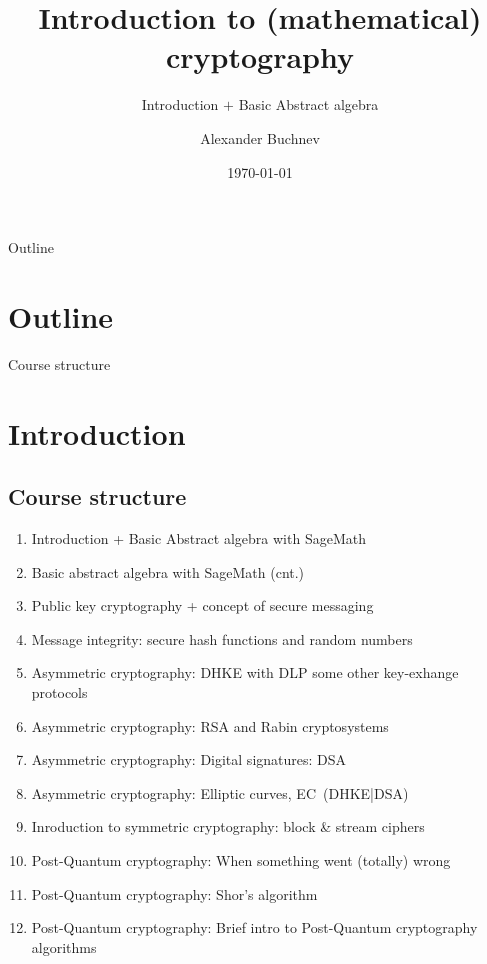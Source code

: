 \documentclass{beamer}
\title{Introduction to (mathematical) cryptography}
\subtitle{Introduction $+$ Basic Abstract algebra}
\author{Alexander Buchnev}
\date{\monthYear\today}
\begin{document}
\frame{
	\titlepage
}

\begin{frame}{Outline}
    \section{Outline}
	\tableofcontents
\end{frame}

\begin{frame}{Course structure}
    \section{Introduction}
    \subsection{Course structure}
    \begin{enumerate}
        \item Introduction + Basic Abstract algebra with SageMath
        \item Basic abstract algebra with SageMath (cnt.)
        \item Public key cryptography + concept of secure messaging %
        \item Message integrity: secure hash functions and random numbers
        \item Asymmetric cryptography: DHKE with DLP some other key-exhange protocols 
        \item Asymmetric cryptography: RSA and Rabin cryptosystems
        \item Asymmetric cryptography: Digital signatures: DSA
        \item Asymmetric cryptography: Elliptic curves, EC~(DHKE|DSA)
        \item Inroduction to symmetric cryptography: block \& stream ciphers
        \item Post-Quantum cryptography: When something went (totally) wrong
        \item Post-Quantum cryptography: Shor's algorithm
        \item Post-Quantum cryptography: Brief intro to Post-Quantum cryptography algorithms
    \end{enumerate}
\end{frame}
\end{document}
